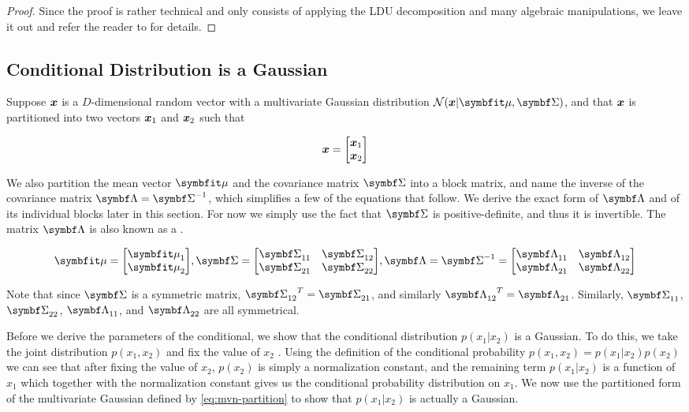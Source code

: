 \begin{proof}
  Since the proof is rather technical and only consists of applying the
  LDU decomposition and many algebraic manipulations, we leave it out and
  refer the reader to \cite{murphy2012machine} for details.
\end{proof}


\subsection{Conditional Distribution is a Gaussian}

Suppose ${\boldsymbol{x}}$ is a $D$-dimensional random vector with a multivariate Gaussian distribution
$\gN(\vx | \vmu, \mSigma)$, and that ${\boldsymbol{x}}$ is partitioned into two vectors
${\boldsymbol{x}}_1$ and ${\boldsymbol{x}}_2$ such that

\begin{equation}
  {\boldsymbol{x}} = {\begin{bmatrix} {\boldsymbol{x}}_1 \\ {\boldsymbol{x}}_2 \end{bmatrix}}
\end{equation}

We also partition the mean vector $\vmu$ and the covariance matrix $\mSigma$
into a block matrix, and name the inverse of the covariance matrix $\mLambda =
\mSigma^{-1}$, which simplifies a few of the equations that follow. We
derive the exact form of $\mLambda$ and of its individual blocks later in this
section. For now we simply use the fact that $\mSigma$ is positive-definite,
and thus it is invertible. The matrix $\mLambda$ is also known as a
.

\begin{equation}
  \vmu = \partmu,
  \mSigma = \partsigma, \mLambda = \mSigma^{-1} = \partlambda \label{eq:mvn-partition}
\end{equation}

Note that since $\mSigma$ is a symmetric matrix, $\ms{12}^T = \ms{21}$, and
similarly $\ml{12}^T = \ml{21}$. Similarly, $\ms{11}$, $\ms{22}$, $\ml{11}$,
and $\ml{22}$ are all symmetrical.

Before we derive the parameters of the conditional, we show that the
conditional distribution $p(x_1 | x_2)$ is a Gaussian. To do this, we take the
joint distribution $p(x_1, x_2)$ and fix the value of $x_2$
\citep{bishop2016pattern}. Using the definition of the conditional probability
$p(x_1, x_2) = p(x_1 | x_2) p(x_2)$ we can see that after fixing the value of
$x_2$, $p(x_2)$ is simply a normalization constant, and the remaining term
$p(x_1 | x_2)$ is a function of $x_1$ which together with the normalization
constant gives us the conditional probability distribution on $x_1$.
We now use the partitioned form of the multivariate Gaussian defined by
\autoref{eq:mvn-partition} to show that $p(x_1 | x_2)$ is actually a Gaussian.


